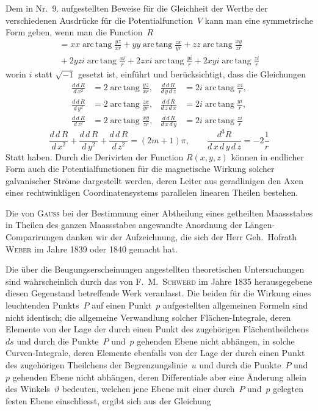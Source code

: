 \documentclass[12pt,a4paper]{article}
\DeclareMathOperator{\arctang}{arc\,tang}
\begin{document}
Dem in Nr.~9. aufgestellten Beweise für die Gleichheit der Werthe der verschiedenen Ausdrücke für die Potentialfunction~$V$ kann man eine symmetrische Form geben, wenn man die Function~$R$
\begin{multline*}
= xx\arctang\frac{yz}{xr} + yy\arctang\frac{zx}{yr} + zz\arctang\frac{xy}{zr}
\\
{}+ 2yzi\arctang\frac{xi}{r} + 2zxi\arctang\frac{yi}{r} + 2xyi\arctang\frac{zi}{r}
\end{multline*}
worin $i$ statt $\sqrt{-1}$ gesetzt ist, einführt und berücksichtigt, dass die Gleichungen
\begin{align*}
\frac{d\,d\,R}{d\,x^2} &= 2\arctang\frac{yz}{xr}, &
\frac{d\,d\,R}{d\,y\,d\,z} &= 2i\arctang\frac{xi}{r}, \\
\frac{d\,d\,R}{d\,y^2} &= 2\arctang\frac{zx}{yr}, &
\frac{d\,d\,R}{d\,z\,d\,x} &= 2i\arctang\frac{yi}{r}, \\
\frac{d\,d\,R}{d\,z^2} &= 2\arctang\frac{xy}{zr}, &
\frac{d\,d\,R}{d\,x\,d\,y} &= 2i\arctang\frac{zi}{r}
\end{align*}
\[
\frac{d\,d\,R}{d\,x^2} + \frac{d\,d\,R}{d\,y^2} + \frac{d\,d\,R}{d\,z^2} = (2m+1)\pi,
\qquad
\frac{d^3 R}{d\,x\,d\,y\,d\,z} = -2\frac{1}{r}
\]
Statt haben. Durch die Derivirten der Function $R(x,y,z)$ können in endlicher Form auch die Potentialfunctionen für die magnetische Wirkung solcher galvanischer Ströme dargestellt werden, deren Leiter aus geradlinigen den Axen eines rechtwinkligen Coordinatensystems parallelen linearen Theilen bestehen.

\vspace{0.5em}

Die von \textsc{Gauss} bei der Bestimmung einer Abtheilung eines getheilten Maassstabes in Theilen des ganzen Maassstabes angewandte Anordnung der Längen-Comparirungen danken wir der Aufzeichnung, die sich der Herr Geh.~Hofrath \textsc{Weber} im Jahre 1839 oder 1840 gemacht hat.

\vspace{0.5em}

Die über die Beugungserscheinungen angestellten theoretischen Untersuchungen sind wahrscheinlich durch das von \textsc{F.~M.~Schwerd} im Jahre 1835 herausgegebene diesen Gegenstand betreffende Werk veranlasst. Die beiden für die Wirkung eines leuchtenden Punkts~$P$ auf einen Punkt~$p$ aufgestellten allgemeinen Formeln sind nicht identisch; die allgemeine Verwandlung solcher Flächen-Integrale, deren Elemente von der Lage der durch einen Punkt des zugehörigen Flächentheilchens~$ds$ und durch die Punkte~$P$ und~$p$ gehenden Ebene nicht abhängen, in solche Curven-Integrale, deren Elemente ebenfalls von der Lage der durch einen Punkt des zugehörigen Theilchens der Begrenzungslinie~$u$ und durch die Punkte~$P$ und~$p$ gehenden Ebene nicht abhängen, deren Differentiale aber eine Änderung allein des Winkels~$\vartheta$ bedeuten, welchen jene Ebene mit einer durch~$P$ und~$p$ gelegten festen Ebene einschliesst, ergibt sich aus der Gleichung
\end{document}
